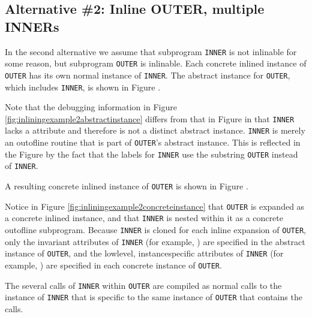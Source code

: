 \subsection{Alternative \#2: Inline OUTER, multiple INNERs}
\label{app:inlineoutermultiipleinners}


In the second alternative we assume that subprogram \texttt{INNER}
is not inlinable for some reason, but subprogram \texttt{OUTER} is
inlinable. 
Each concrete inlined instance of \texttt{OUTER} has its
own normal instance of \texttt{INNER}. 
The abstract instance for \texttt{OUTER},
which includes \texttt{INNER}, is shown in 
Figure .

Note that the debugging information in 
Figure \ref{fig:inliningexample2abstractinstance}
differs from that in 
Figure 
in that \texttt{INNER} lacks a 
 attribute
and therefore is not a distinct abstract instance. \texttt{INNER}
is merely an out\dash of\dash line routine that is part of \texttt{OUTER}\textquoteright s
abstract instance. This is reflected in the Figure by
the fact that the labels for \texttt{INNER} use the substring \texttt{OUTER}
instead of \texttt{INNER}.

A resulting 
concrete inlined instance of \texttt{OUTER} is shown in
Figure .

Notice in 
Figure \ref{fig:inliningexample2concreteinstance}
that \texttt{OUTER} is expanded as a concrete
inlined instance, and that \texttt{INNER} is nested within it as a
concrete out\dash of\dash line subprogram. Because \texttt{INNER} is cloned
for each inline expansion of \texttt{OUTER}, only the invariant
attributes of \texttt{INNER} 
(for example, ) are specified
in the abstract instance of \texttt{OUTER}, and the low\dash level,
instance\dash specific attributes of \texttt{INNER} (for example,
) are specified in 
each concrete instance of \texttt{OUTER}.

The several calls of \texttt{INNER} within \texttt{OUTER} are compiled as normal
calls to the instance of \texttt{INNER} that is specific to the same
instance of \texttt{OUTER} that contains the calls.

